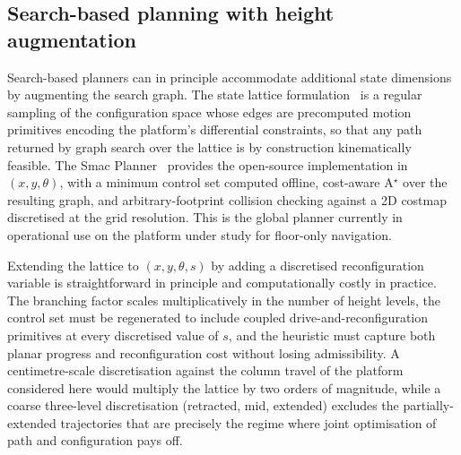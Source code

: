 \documentclass[11pt,a4paper]{article}
\begin{document}
\subsection{Search-based planning with height augmentation}
\label{sec:sq4:search}

Search-based planners can in principle accommodate additional state dimensions by augmenting the search graph. The state lattice formulation~\parencite{pivtoraikoDifferentiallyConstrainedMobile2009} is a regular sampling of the configuration space whose edges are precomputed motion primitives encoding the platform's differential constraints, so that any path returned by graph search over the lattice is by construction kinematically feasible. The Smac Planner~\parencite{macenskiOpenSourceCostAwareKinematically2025} provides the open-source implementation in $(x, y, \theta)$, with a minimum control set computed offline, cost-aware A$^{\star}$ over the resulting graph, and arbitrary-footprint collision checking against a 2D costmap discretised at the grid resolution. This is the global planner currently in operational use on the platform under study for floor-only navigation.

Extending the lattice to $(x, y, \theta, s)$ by adding a discretised reconfiguration variable is straightforward in principle and computationally costly in practice. The branching factor scales multiplicatively in the number of height levels, the control set must be regenerated to include coupled drive-and-reconfiguration primitives at every discretised value of $s$, and the heuristic must capture both planar progress and reconfiguration cost without losing admissibility. A centimetre-scale discretisation against the column travel of the platform considered here would multiply the lattice by two orders of magnitude, while a coarse three-level discretisation (retracted, mid, extended) excludes the partially-extended trajectories that are precisely the regime where joint optimisation of path and configuration pays off.
\end{document}
